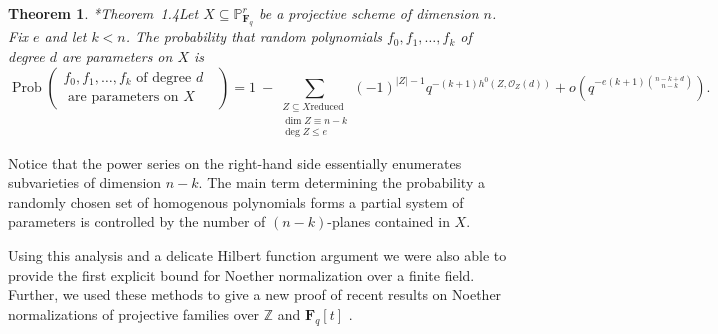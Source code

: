 \documentclass[10pt,reqno]{amsart}
\newtheorem{theorem}[lemma]{Theorem}
\newtheorem{cor}[lemma]{Corollary}
\theoremstyle{remark}
\newcommand{\Prob}{\operatorname{Prob}}
\newcommand{\fF}{\mathbf F}
\renewcommand{\O}{\mathcal{O}}
\renewcommand{\P}{\mathbb{P}}
\newcommand{\Z}{\mathbb{Z}}
\begin{document}
\begin{theorem}\cite{bruceErman-sop}*{Theorem~1.4}\label{thm:main finite field}
Let $X\subseteq \P^r_{\fF_q}$ be a projective scheme of dimension $n$. Fix $e$ and let $k<n$. The probability that random polynomials $f_0,f_1,\dots,f_k$ of degree $d$ are parameters on $X$ is
\[
\Prob\left(\begin{matrix}f_0,f_1,\dots,f_{k} \text{ of degree $d$ } \\ \text{ are parameters on $X$}\end{matrix}\right) = 1 \ - 
\sum_{\begin{smallmatrix}Z\subseteq X \text{reduced} \\ \dim Z \equiv n-k\\ \deg Z \leq e  \end{smallmatrix}}(-1)^{|Z|-1}q^{-(k+1)h^0(Z,\O_Z(d))}+ o\left(q^{-e(k+1)\binom{n-k+d}{n-k}}\right).
\]
\end{theorem}

Notice that the power series on the right-hand side essentially enumerates subvarieties of dimension $n-k$. The main term determining the probability a randomly chosen set of homogenous polynomials forms a partial system of parameters is controlled by the number of $(n-k)$-planes contained in $X$. 


Using this analysis and a delicate Hilbert function argument we were also able to provide the first explicit bound for Noether normalization over a finite field. Further, we used these methods to give a new proof of recent results on Noether normalizations of projective families over $\Z$ and $\fF_{q}[t]$ \cite{gabberLiuLorenzini15, cmbpt}.
\end{document}
